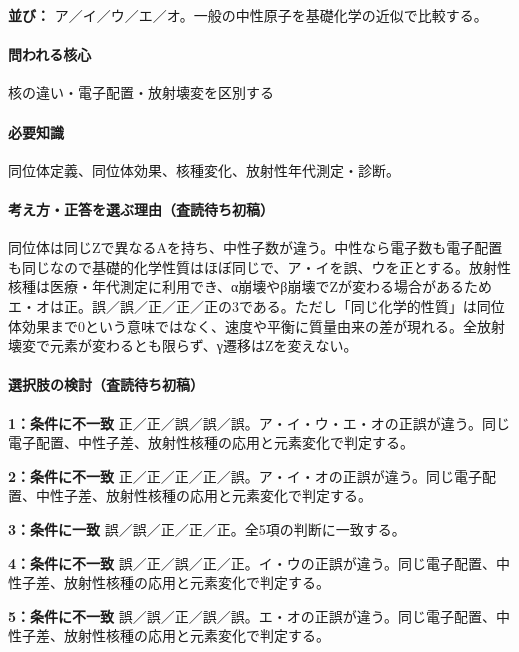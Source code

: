 \noindent\textbf{並び：} ア／イ／ウ／エ／オ。一般の中性原子を基礎化学の近似で比較する。\par

\paragraph{問われる核心} 核の違い・電子配置・放射壊変を区別する

\paragraph{必要知識} 同位体定義、同位体効果、核種変化、放射性年代測定・診断。

\paragraph{考え方・正答を選ぶ理由（査読待ち初稿）} 同位体は同じZで異なるAを持ち、中性子数が違う。中性なら電子数も電子配置も同じなので基礎的化学性質はほぼ同じで、ア・イを誤、ウを正とする。放射性核種は医療・年代測定に利用でき、α崩壊やβ崩壊でZが変わる場合があるためエ・オは正。誤／誤／正／正／正の3である。ただし「同じ化学的性質」は同位体効果まで0という意味ではなく、速度や平衡に質量由来の差が現れる。全放射壊変で元素が変わるとも限らず、γ遷移はZを変えない。

\paragraph{選択肢の検討（査読待ち初稿）}\mbox{}\par

\noindent\textbf{1：条件に不一致} 正／正／誤／誤／誤。ア・イ・ウ・エ・オの正誤が違う。同じ電子配置、中性子差、放射性核種の応用と元素変化で判定する。\par

\noindent\textbf{2：条件に不一致} 正／正／正／正／誤。ア・イ・オの正誤が違う。同じ電子配置、中性子差、放射性核種の応用と元素変化で判定する。\par

\noindent\textbf{3：条件に一致} 誤／誤／正／正／正。全5項の判断に一致する。\par

\noindent\textbf{4：条件に不一致} 誤／正／誤／正／正。イ・ウの正誤が違う。同じ電子配置、中性子差、放射性核種の応用と元素変化で判定する。\par

\noindent\textbf{5：条件に不一致} 誤／誤／正／誤／誤。エ・オの正誤が違う。同じ電子配置、中性子差、放射性核種の応用と元素変化で判定する。\par

